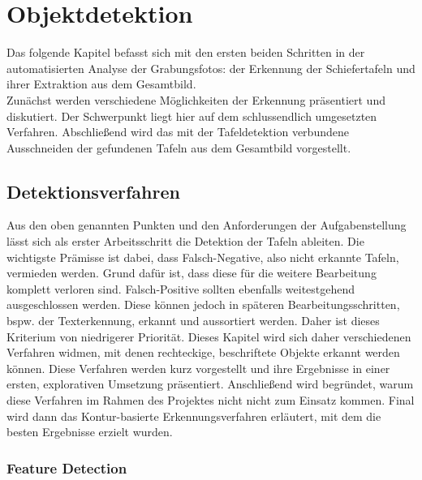 \section{Objektdetektion}

Das folgende Kapitel befasst sich mit den ersten beiden Schritten in der automatisierten Analyse der Grabungsfotos: der Erkennung der Schiefertafeln und ihrer Extraktion aus dem Gesamtbild.\\
Zunächst werden verschiedene Möglichkeiten der Erkennung präsentiert und diskutiert. Der Schwerpunkt liegt hier auf dem schlussendlich umgesetzten Verfahren.
Abschließend wird das mit der Tafeldetektion verbundene Ausschneiden der gefundenen Tafeln aus dem Gesamtbild vorgestellt.

\subsection{Detektionsverfahren}

Aus den oben genannten Punkten und den Anforderungen der Aufgabenstellung lässt sich als erster Arbeitsschritt die Detektion der Tafeln ableiten. Die wichtigste Prämisse ist dabei, dass Falsch-Negative, also nicht erkannte Tafeln, vermieden werden. Grund dafür ist, dass diese für die weitere Bearbeitung komplett verloren sind. Falsch-Positive sollten ebenfalls weitestgehend ausgeschlossen werden. Diese können jedoch in späteren Bearbeitungsschritten, bspw. der Texterkennung, erkannt und aussortiert werden. Daher ist dieses Kriterium von niedrigerer Priorität.
Dieses Kapitel wird sich daher verschiedenen Verfahren widmen, mit denen rechteckige, beschriftete Objekte erkannt werden können. Diese Verfahren werden kurz vorgestellt und ihre Ergebnisse in einer ersten, explorativen Umsetzung präsentiert. Anschließend wird begründet, warum diese Verfahren im Rahmen des Projektes nicht nicht zum Einsatz kommen. Final wird dann das Kontur-basierte Erkennungsverfahren erläutert, mit dem die besten Ergebnisse erzielt wurden.


\subsubsection{Feature Detection}

